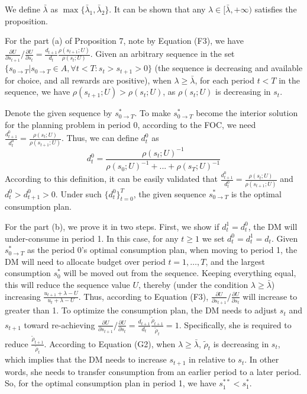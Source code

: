 We define \(\bar{\lambda}\) as
\(\max\{\bar{\lambda}_1,\bar{\lambda}_2\}\). It can be shown that any
\(\lambda\in[\bar{\lambda},+\infty)\) satisfies the proposition.

For the part (a) of Proposition 7, note by Equation (F3), we have
\(\frac{\partial U}{\partial s_{t+1}}/\frac{\partial U}{\partial s_t}=\frac{d_{t+1}}{d_t} \frac{\rho(s_{t+1};U)}{\rho(s_t;U)}\).
Given an arbitrary sequence in the set
\(\{s_{0\rightarrow T}|s_{0\rightarrow T}\in A, \forall t<T:s_t>s_{t+1}>0\}\)
(the sequence is decreasing and available for choice, and all rewards
are positive), when \(\lambda \geq \bar{\lambda}\), for each period
\(t<T\) in the sequence, we have \(\rho(s_{t+1};U)>\rho(s_t;U)\), as
\(\rho(s_t;U)\) is decreasing in \(s_t\).

Denote the given sequence by \(s_{0\rightarrow T}^*\). To make
\(s_{0\rightarrow T}^*\) become the interior solution for the planning
problem in period 0, according to the FOC, we need
\(\frac{d_{t+1}^0}{d_t^0}=\frac{\rho(s_t;U)}{\rho(s_{t+1};U)}\). Thus,
we can define \(d_t^0\) as\[
d_t^0 = \frac{\rho(s_t;U)^{-1}}{\rho(s_0;U)^{-1}+...+\rho(s_T;U)^{-1}}
\]According to this definition, it can be easily validated that
\(\frac{d_{t+1}^0}{d_t^0}=\frac {\rho(s_t;U)}{\rho(s_{t+1};U)}\) and
\(d_t^0>d_{t+1}^0>0\). Under such \(\{d_t^0\}_{t=0}^T\), the given
sequence \(s_{0\rightarrow T}^*\) is the optimal consumption plan.

For the part (b), we prove it in two steps. First, we show if
\(d_t^1=d_t^0\), the DM will under-consume in period 1. In this case,
for any \(t\geq 1\) we set \(d_t^0=d_t^1=d_t\). Given
\(s_{0\rightarrow T}^*\) as the period 0's optimal consumption plan,
when moving to period 1, the DM will need to allocate budget over period
\(t=1,…,T\), and the largest consumption \(s_0^*\) will be moved out
from the sequence. Keeping everything equal, this will reduce the
sequence value \(U\), thereby (under the condition
\(\lambda\geq \bar{\lambda}\)) increasing
\(\frac{u_{t+1}+\lambda-U}{u_t+\lambda-U}\). Thus, according to Equation
(F3),
\(\frac{\partial U}{\partial s_{t+1}}/\frac{\partial U}{\partial s_{t}}\)
will increase to greater than 1. To optimize the consumption plan, the
DM needs to adjust \(s_t\) and \(s_{t+1}\) toward re-achieving
\(\frac{\partial U}{\partial s_{t+1}}/\frac{\partial U}{\partial s_{t}}=\frac{d_{t+1}}{d_t}\frac{\tilde{\rho}_{t+1}}{\tilde{\rho}_t}=1\).
Specifically, she is required to reduce
\(\frac{\tilde{\rho}_{t+1}}{\tilde{\rho}_t}\). According to Equation
(G2), when \(\lambda\geq\bar{\lambda}\), \(\tilde{\rho}_t\) is
decreasing in \(s_t\), which implies that the DM needs to increase
\(s_{t+1}\) in relative to \(s_t\). In other words, she needs to
transfer consumption from an earlier period to a later period. So, for
the optimal consumption plan in period 1, we have \(s_1^{**}<s_1^*\).

